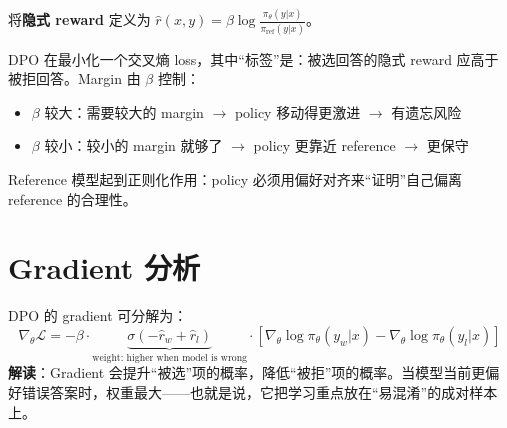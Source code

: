 \begin{intuitionbox}[DPO 实际在做什么]
将\textbf{隐式 reward} 定义为 $\hat{r}(x,y) = \beta\log\frac{\pi_\theta(y|x)}{\pi_\text{ref}(y|x)}$。

DPO 在最小化一个交叉熵 loss，其中“标签”是：被选回答的隐式 reward 应高于被拒回答。Margin 由 $\beta$ 控制：

\begin{itemize}
  \item $\beta$ 较大：需要较大的 margin $\rightarrow$ policy 移动得更激进 $\rightarrow$ 有遗忘风险
  \item $\beta$ 较小：较小的 margin 就够了 $\rightarrow$ policy 更靠近 reference $\rightarrow$ 更保守
\end{itemize}

Reference 模型起到正则化作用：policy 必须用偏好对齐来“证明”自己偏离 reference 的合理性。
\end{intuitionbox}

\section{Gradient 分析}
\label{gradient-analysis}

DPO 的 gradient 可分解为：
\begin{equation}
\nabla_\theta \mathcal{L} = -\beta \cdot \underbrace{\sigma(-\hat{r}_w + \hat{r}_l)}_{\text{weight: higher when model is wrong}} \cdot \left[\nabla_\theta \log\pi_\theta(y_w|x) - \nabla_\theta \log\pi_\theta(y_l|x)\right]
\end{equation}
\textbf{解读}：Gradient 会提升“被选”项的概率，降低“被拒”项的概率。当模型当前更偏好错误答案时，权重最大——也就是说，它把学习重点放在“易混淆”的成对样本上。

